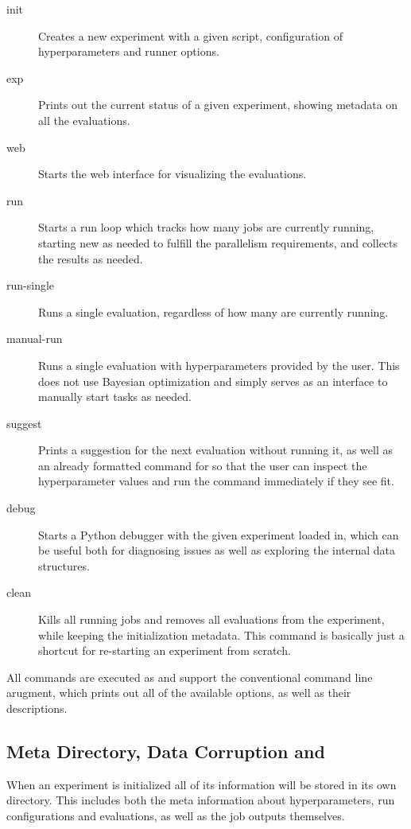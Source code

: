\begin{description}
    \item[init] Creates a new experiment with a given script, configuration of hyperparameters and runner options.
    \item[exp] Prints out the current status of a given experiment, showing metadata on all the evaluations.
    \item[web] Starts the web interface for visualizing the evaluations.
    \item[run] Starts a run loop which tracks how many jobs are currently running, starting new as needed to fulfill the parallelism requirements, and collects the results as needed.
    \item[run-single] Runs a single evaluation, regardless of how many are currently running.
    \item[manual-run] Runs a single evaluation with hyperparameters provided by the user. This does not use Bayesian optimization and simply serves as an interface to manually start tasks as needed.
    \item[suggest] Prints a suggestion for the next evaluation without running it, as well as an already formatted command for  so that the user can inspect the hyperparameter values and run the command immediately if they see fit.
    \item[debug] Starts a Python debugger with the given experiment loaded in, which can be useful both for diagnosing issues as well as exploring the internal data structures.
    \item[clean] Kills all running jobs and removes all evaluations from the experiment, while keeping the initialization metadata. This command is basically just a shortcut for re-starting an experiment from scratch.
\end{description}

All commands are executed as  and support the conventional  command line arugment, which prints out all of the available options, as well as their descriptions.

\subsection{Meta Directory, Data Corruption and }

When an experiment is initialized all of its information will be stored in its own directory. This includes both the meta information about hyperparameters, run configurations and evaluations, as well as the job outputs themselves.

